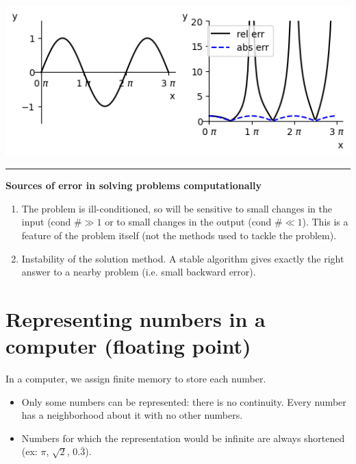 \documentclass[12pt,letterpaper,noanswers]{exam}
\begin{document}
\includegraphics{img/C01sin.png}

\vspace{0.2cm}
\hrule
\vspace{0.2cm}

\noindent \textbf{Sources of error in solving problems computationally}
\begin{tcolorbox}
\begin{enumerate}
\itemsep0pt
    \item The problem is ill-conditioned, so will be sensitive to small changes in the input ($\text{cond }\# \gg 1$ or to small changes in the output ($\text{cond }\# \ll 1$).  This is a feature of the problem itself (not the methods used to tackle the problem).
    \item Instability of the solution method.  A stable algorithm gives exactly the right answer to a nearby problem (i.e. small backward error).
    
\end{enumerate}
\end{tcolorbox}

\section{Representing numbers in a computer (floating point)}

In a computer, we assign finite memory to store each number.  
\begin{itemize}
\itemsep0pt
    \item Only some numbers can be represented: there is no continuity.  Every number has a neighborhood about it with no other numbers.
    \item Numbers for which the representation would be infinite are always shortened (ex: $\pi$, $\sqrt{2}$, $0.\bar{3}$).
\end{itemize}
\end{document}

